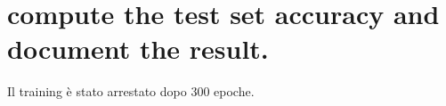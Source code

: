 \documentclass[a4paper,12pt]{article} %
\begin{document}
	\section{compute the test set accuracy and document the result.} 
	\label{section:finalmodel}
	
	Il training è stato arrestato dopo 300 epoche.
	
%			
%			
\end{document}
